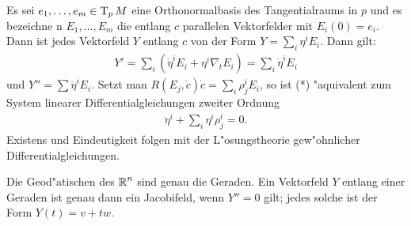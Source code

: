 \begin{bew}
  Es sei $e_1, \ldots, e_m \in \operatorname{T}_pM$ eine Orthonormalbasis des
  Tangentialraums in $p$ und es bezeichne n $E_1, \ldots, E_m$ die
  entlang $c$ parallelen Vektorfelder mit $E_i(0) = e_i$. Dann ist
  jedes Vektorfeld $Y$ entlang $c$ von der Form $Y = \sum_i
  \eta^iE_i$. Dann gilt:
  \begin{align*}
    Y' = \sum_i (\dot \eta^i E_i + \eta^i\nabla_tE_i) = \sum_i \dot
    \eta^i E_i
  \end{align*}
  und $Y'' = \sum \ddot \eta^i E_i$. Setzt man $R(E_j,\dot c)\dot c =
  \sum_i\rho_j^i E_i$, so ist (*) "aquivalent
  zum System linearer Differentialgleichungen zweiter Ordnung
  \begin{align*}
    \ddot \eta^i + \sum_i \eta^i\rho_j^i = 0.
  \end{align*}
  Existens und Eindeutigkeit folgen mit der L"osungstheorie
  gew"ohnlicher Differentialgleichungen.
\end{bew}

\begin{bsp}
  Die Geod"atischen des $\operatorname{\mathbb{R}}^n$ sind genau die Geraden.
  Ein Vektorfeld $Y$ entlang einer Geraden ist genau dann ein Jacobifeld, wenn $Y'' = 0$ gilt; jedes solche ist der Form $Y(t) = v + tw$.
  \begin{center}\end{center}
\end{bsp}


